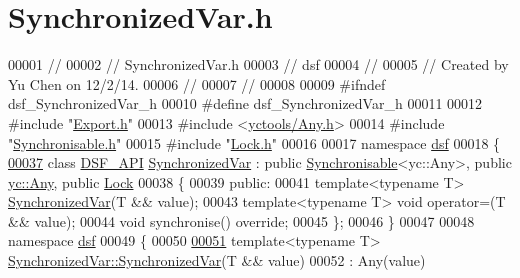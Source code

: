 \hypertarget{_synchronized_var_8h_source}{}\section{Synchronized\+Var.\+h}
\label{_synchronized_var_8h_source}

\begin{DoxyCode}
00001 \textcolor{comment}{//}
00002 \textcolor{comment}{//  SynchronizedVar.h}
00003 \textcolor{comment}{//  dsf}
00004 \textcolor{comment}{//}
00005 \textcolor{comment}{//  Created by Yu Chen on 12/2/14.}
00006 \textcolor{comment}{//}
00007 \textcolor{comment}{//}
00008 
00009 \textcolor{preprocessor}{#ifndef dsf\_SynchronizedVar\_h}
00010 \textcolor{preprocessor}{#define dsf\_SynchronizedVar\_h}
00011 
00012 \textcolor{preprocessor}{#include "\hyperlink{dsf_2_export_8h}{Export.h}"}
00013 \textcolor{preprocessor}{#include <\hyperlink{_any_8h}{yctools/Any.h}>}
00014 \textcolor{preprocessor}{#include "\hyperlink{_synchronisable_8h}{Synchronisable.h}"}
00015 \textcolor{preprocessor}{#include "\hyperlink{_lock_8h}{Lock.h}"}
00016 
00017 \textcolor{keyword}{namespace }\hyperlink{namespacedsf}{dsf}
00018 \{
\hypertarget{_synchronized_var_8h_source_l00037}{}\hyperlink{classdsf_1_1_synchronized_var}{00037}     \textcolor{keyword}{class }\hyperlink{dsf_2_export_8h_ad7bb940831423512f29a6981786c37bd}{DSF\_API} \hyperlink{classdsf_1_1_synchronized_var}{SynchronizedVar} : \textcolor{keyword}{public} \hyperlink{classdsf_1_1_synchronisable}{Synchronisable}<yc::Any>, \textcolor{keyword}{
      public} \hyperlink{classyc_1_1_any}{yc::Any}, \textcolor{keyword}{public} \hyperlink{classdsf_1_1_lock}{Lock}
00038     \{
00039     \textcolor{keyword}{public}:
00041         \textcolor{keyword}{template}<\textcolor{keyword}{typename} T> \hyperlink{classdsf_1_1_synchronized_var}{SynchronizedVar}(T && value);
00043         \textcolor{keyword}{template}<\textcolor{keyword}{typename} T> \textcolor{keywordtype}{void} operator=(T && value);
00044         \textcolor{keywordtype}{void} synchronise() \textcolor{keyword}{override};
00045     \};
00046 \}
00047 
00048 \textcolor{keyword}{namespace }\hyperlink{namespacedsf}{dsf}
00049 \{
00050     
\hypertarget{_synchronized_var_8h_source_l00051}{}\hyperlink{classdsf_1_1_synchronized_var_aada6540bf8bbbf1451834f31aad0962f}{00051}     \textcolor{keyword}{template}<\textcolor{keyword}{typename} T> \hyperlink{classdsf_1_1_synchronized_var_aada6540bf8bbbf1451834f31aad0962f}{SynchronizedVar::SynchronizedVar}(T && value)
00052     : Any(value)

\end{DoxyCode}
